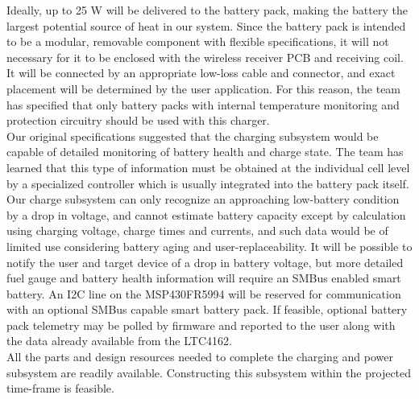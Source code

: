 \documentclass[12pt]{article}
\begin{document}
\pagebreak

\indent
Ideally, up to 25 W will be delivered to the battery pack, making the battery the largest potential source of heat in our system. Since the battery pack is intended to be a modular, removable component with flexible specifications, it will not necessary for it to be enclosed with the wireless receiver PCB and receiving coil. It will be connected by an appropriate low-loss cable and connector, and exact placement will be determined by the user application. For this reason, the team has specified that only battery packs with internal temperature monitoring and protection circuitry should be used with this charger.\\

\indent
Our original specifications suggested that the charging subsystem would be capable of detailed monitoring of battery health and charge state. The team has learned that this type of information must be obtained at the individual cell level by a specialized controller which is usually integrated into the battery pack itself. Our charge subsystem can only recognize an approaching low-battery condition by a drop in voltage, and cannot estimate battery capacity except by calculation using charging voltage, charge times and currents, and such data would be of limited use considering battery aging and user-replaceability. It will be possible to notify the user and target device of a drop in battery voltage, but more detailed fuel gauge and battery health information will require an SMBus enabled smart battery. An I2C line on the MSP430FR5994 will be reserved for communication with an optional SMBus capable smart battery pack. If feasible, optional battery pack telemetry may be polled by firmware and reported to the user along with the data already available from the LTC4162.\\

\indent
All the parts and design resources needed to complete the charging and power subsystem are readily available. Constructing this subsystem within the projected time-frame is feasible.
\end{document}
